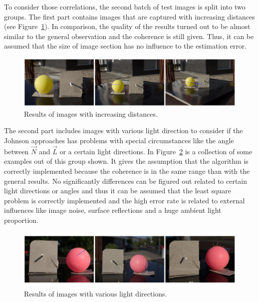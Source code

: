 To consider those correlations, the second batch of test images is split into two groups. The first part contains images that are captured with increasing distances (see Figure~\ref{fig:difDistance}). In comparison, the quality of the results turned out to be almost similar to the general observation and the coherence is still given. Thus, it can be assumed that the size of image section has no influence to the estimation error. 
\begin{figure}[H] 

	\center 
	\includegraphics[width=\linewidth]{Images/versch_Anstaende.jpg}
	\caption[Bildunterschrift]{Results of images with increasing distances.}
		\label{fig:difDistance}		
\end{figure}
The second part includes images with various light direction to consider if the Johnson approaches has problems with special circumstances like the angle between $\vec{N}$ and $\vec{L}$ or a certain light directions. In Figure~\ref{fig:divLightDirect} is a collection of some examples out of this group shown. It gives the assumption that the algorithm is correctly implemented because the coherence is in the same range than with the general results. No significantly differences can be figured out related to certain light directions or angles and thus it can be assumed that the least square problem is correctly implemented and the high error rate is related to external influences like image noise, surface reflections and a huge ambient light proportion.
\begin{figure}[H] 

	\center 
	\includegraphics[width=\linewidth]{Images/versch_Lichtrichtungen.jpg}
	\caption[Bildunterschrift]{Results of images with various light directions.}
		\label{fig:divLightDirect}		
\end{figure}

